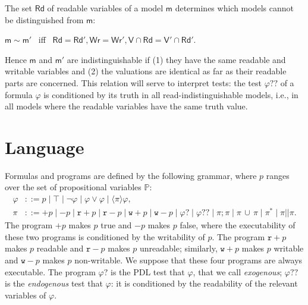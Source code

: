 \documentclass{llncs}
\newcommand{\atm}{x}
\newcommand{\modl}{\mathsf m}
\newcommand{\pll}{ {||} }							%
\newcommand{\readset}{\mathsf{Rd}}
\newcommand{\valuset}{\mathsf{V}}
\newcommand{\writeset}{\mathsf{Wr}}
\newcommand{\testendo}{?\!\!?}			%
\newcommand{\testpdl}{?}				%
\newcommand{\assgn}[2]{{#1 {:=} #2}}
\newcommand{\assgntopR}[1]{{\mathtt r {+} #1}}
\newcommand{\assgnbotR}[1]{{\mathtt r {-} #1}}
\newcommand{\assgntopW}[1]{{\mathtt w {+} #1}}
\newcommand{\assgnbotW}[1]{{\mathtt w {-} #1}}
\newcommand{\assgntopV}[1]{{\mathtt {+} #1}}
\newcommand{\assgnbotV}[1]{{\mathtt {-} #1}}
\newcommand{\ldia}[1]{ \big\langle #1 \big\rangle}
\newcommand{\ndet}{\,{\cup}\,}
\renewcommand{\phi}{\varphi}
\newcommand{\propset}{\mathbb P}
\begin{document}
The set $\readset$ of readable variables of a model $\modl$ 
determines which models cannot be distinguished from $\modl$:
\begin{center}
$\modl \sim \modl'$ \ iff \ $\readset = \readset' , \writeset = \writeset' , \valuset \cap \readset = \valuset' \cap \readset' $.
\end{center}
Hence $\modl $ and $\modl'$ are indistinguishable if 
(1) they have the same readable and writable variables and  
(2) the valuations are identical as far as their readable parts are concerned.
%
This relation will serve to interpret tests: 
the test $\phi \testendo $ of a formula $\phi$ is conditioned by its truth in all read-indistinguishable models, i.e., 
in all models where the readable variables have the same truth value. 


\section{Language}\label{sec:language}

Formulas and programs are defined by the following grammar,
where $p$ ranges over the set of propositional variables $\propset$:
\begin{align*}
\phi & ::= p \mid \top  \mid  \lnot \phi  \mid  \phi \lor \phi  \mid  \ldia \pi \phi ,
\\
\pi & ::= \assgntopV p \mid \assgnbotV p \mid
		\assgntopR p \mid \assgnbotR p \mid
		\assgntopW p \mid \assgnbotW p \mid
			\phi \testpdl \mid 
			\phi \testendo \mid 
			\pi ; \pi \mid \pi \ndet \pi \mid 
			\pi^\ast \mid \pi \pll \pi .
\end{align*}
The program $\assgntopV p$ makes $p$ true and $\assgnbotV p $ makes $p$ false, where the executability of these two programs is conditioned by the writability of $p$. 
%
The program $\assgntopR p$ makes $p$ readable and 
$\assgnbotR p $ makes $p$ unreadable; similarly,
$\assgntopW p$ makes $p$ writable and 
$\assgnbotW p$ makes $p$ non-writable.
We suppose that these four programs are always executable. 
The program $\phi \testpdl$ is the PDL test that $\phi$, that we call \emph{exogenous};
$\phi \testendo $ is the \emph{endogenous} test that $\phi$: it is 
conditioned by the readability of the relevant variables of $\phi$. 
\end{document}
